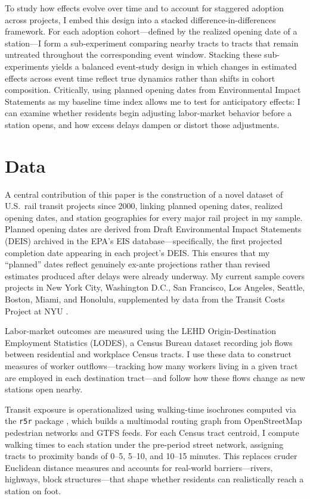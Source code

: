 \documentclass[12pt]{article}
\begin{document}
To study how effects evolve over time and to account for staggered adoption across projects, I embed this design into a stacked difference-in-differences framework. For each adoption cohort---defined by the realized opening date of a station---I form a sub-experiment comparing nearby tracts to tracts that remain untreated throughout the corresponding event window. Stacking these sub-experiments yields a balanced event-study design in which changes in estimated effects across event time reflect true dynamics rather than shifts in cohort composition. Critically, using planned opening dates from Environmental Impact Statements as my baseline time index allows me to test for anticipatory effects: I can examine whether residents begin adjusting labor-market behavior before a station opens, and how excess delays dampen or distort those adjustments.

\section{Data}

A central contribution of this paper is the construction of a novel dataset of U.S.\ rail transit projects since 2000, linking planned opening dates, realized opening dates, and station geographies for every major rail project in my sample. Planned opening dates are derived from Draft Environmental Impact Statements (DEIS) archived in the EPA's EIS database---specifically, the first projected completion date appearing in each project's DEIS. This ensures that my ``planned'' dates reflect genuinely ex-ante projections rather than revised estimates produced after delays were already underway. My current sample covers projects in New York City, Washington D.C., San Francisco, Los Angeles, Seattle, Boston, Miami, and Honolulu, supplemented by data from the Transit Costs Project at NYU \parencite{levy_2025_9wnjp-kez15}.

Labor-market outcomes are measured using the LEHD Origin-Destination Employment Statistics (LODES), a Census Bureau dataset recording job flows between residential and workplace Census tracts. I use these data to construct measures of worker outflows---tracking how many workers living in a given tract are employed in each destination tract---and follow how these flows change as new stations open nearby.

Transit exposure is operationalized using walking-time isochrones computed via the \texttt{r5r} package \parencite{r5r}, which builds a multimodal routing graph from OpenStreetMap pedestrian networks and GTFS feeds. For each Census tract centroid, I compute walking times to each station under the pre-period street network, assigning tracts to proximity bands of 0--5, 5--10, and 10--15 minutes. This replaces cruder Euclidean distance measures and accounts for real-world barriers---rivers, highways, block structures---that shape whether residents can realistically reach a station on foot.
\end{document}
